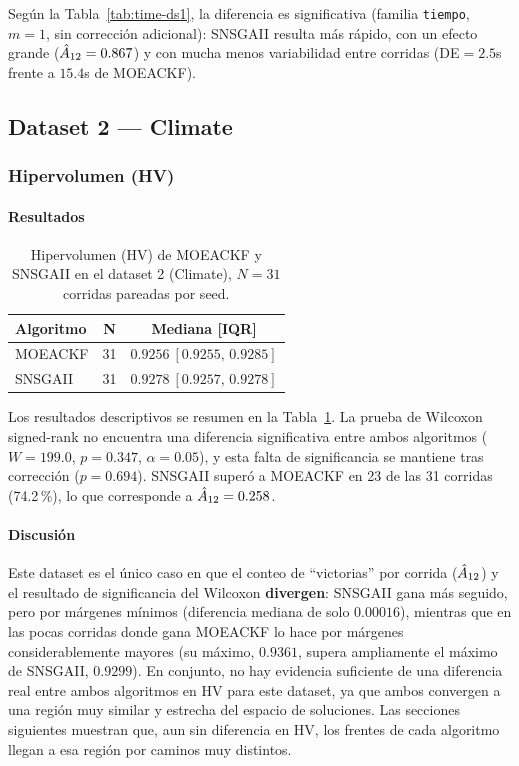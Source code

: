 Según la Tabla~\ref{tab:time-ds1}, la diferencia es significativa (familia \texttt{tiempo},
$m=1$, sin corrección adicional): SNSGAII resulta más rápido, con un efecto grande
($\hat{A}_{12}=0.867$) y con mucha menos variabilidad entre corridas (DE$=2.5$s frente a $15.4$s de
MOEACKF).

\subsection{Dataset 2 --- Climate}
\label{sec:ds2}

\subsubsection{Hipervolumen (HV)}
\label{sec:ds2-hv}

\paragraph{Resultados}

\begin{table}[htbp]
\centering
\small
\caption{Hipervolumen (HV) de MOEACKF y SNSGAII en el dataset 2 (Climate), $N=31$ corridas
pareadas por seed.}
\label{tab:hv-ds2}
\begin{tabular}{@{}lcc@{}}
\toprule
\textbf{Algoritmo} & \textbf{N} & \textbf{Mediana [IQR]} \\
\midrule
MOEACKF & 31 & $0.9256\ [0.9255,\,0.9285]$ \\
SNSGAII & 31 & $0.9278\ [0.9257,\,0.9278]$ \\
\bottomrule
\end{tabular}
\end{table}

Los resultados descriptivos se resumen en la Tabla~\ref{tab:hv-ds2}. La prueba de Wilcoxon
signed-rank no encuentra una diferencia significativa entre ambos algoritmos ($W=199.0$,
$p=0.347$, $\alpha=0.05$), y esta falta de significancia se mantiene tras corrección
($p=0.694$). SNSGAII superó a MOEACKF en 23 de las 31 corridas (74.2\,\%), lo que corresponde a
$\hat{A}_{12}=0.258$.

\paragraph{Discusión}

Este dataset es el único caso en que el conteo de ``victorias'' por corrida ($\hat{A}_{12}$) y el
resultado de significancia del Wilcoxon \textbf{divergen}: SNSGAII gana más seguido, pero por
márgenes mínimos (diferencia mediana de solo $0.00016$), mientras que en las pocas corridas donde
gana MOEACKF lo hace por márgenes considerablemente mayores (su máximo, $0.9361$, supera
ampliamente el máximo de SNSGAII, $0.9299$). En conjunto, no hay evidencia suficiente de una
diferencia real entre ambos algoritmos en HV para este dataset, ya que ambos convergen a una
región muy similar y estrecha del espacio de soluciones. Las secciones siguientes muestran que,
aun sin diferencia en HV, los frentes de cada algoritmo llegan a esa región por caminos muy
distintos.

